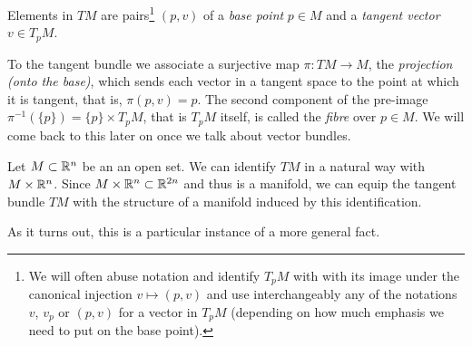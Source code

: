 Elements in $TM$ are pairs\footnote{We will often abuse notation and identify $T_pM$ with with its image under the canonical injection $v\mapsto(p,v)$ and use interchangeably any of the notations $v$, $v_p$ or $(p,v)$ for a vector in $T_pM$ (depending on how much emphasis we need to put on the base point).} $(p,v)$ of a \emph{base point} $p\in M$ and a \emph{tangent vector} $v\in T_pM$.

To the tangent bundle we associate a surjective map $\pi:TM \to M$, the \emph{projection (onto the base)}, which sends each vector in a tangent space to the point at which it is tangent, that is, $\pi(p,v) = p$.
The second component of the pre-image $\pi^{-1}(\{p\}) = \{p\}\times T_pM$, that is $T_pM$ itself, is called the \emph{fibre} over $p\in M$.
We will come back to this later on once we talk about vector bundles.

\begin{example}
  Let $M\subset \mathbb{R}^n$ be an an open set.
  We can identify $TM$ in a natural way with $M\times\mathbb{R}^n$.
  Since $M\times\mathbb{R}^n \subset \mathbb{R}^{2n}$ and thus is a manifold, we can equip the tangent bundle $TM$ with the structure of a manifold induced by this identification.
\end{example}

As it turns out, this is a particular instance of a more general fact.

